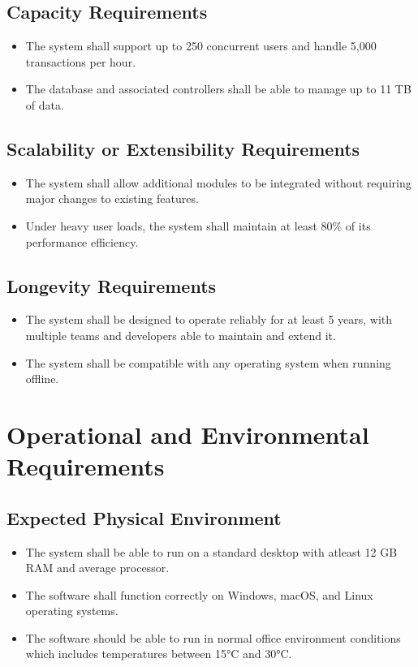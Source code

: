 \documentclass[12pt]{article}
\begin{document}
\subsection{Capacity Requirements}
\begin{itemize}
    \item The system shall support up to 250 concurrent users and handle 5,000 transactions per hour.
    \item The database and associated controllers shall be able to manage up to 11 TB of data.
\end{itemize}

\subsection{Scalability or Extensibility Requirements}
\begin{itemize}
    \item The system shall allow additional modules to be integrated without requiring major changes to existing features.
    \item Under heavy user loads, the system shall maintain at least 80\% of its performance efficiency.
\end{itemize}

\subsection{Longevity Requirements}
\begin{itemize}
    \item The system shall be designed to operate reliably for at least 5 years, with multiple teams and developers able to maintain and extend it.
    \item The system shall be compatible with any operating system when running offline.
\end{itemize}


\section{Operational and Environmental Requirements}
\subsection{Expected Physical Environment}
\begin{itemize}
    \item The system shall be able to run on a standard desktop with atleast 12 GB RAM and average processor.
    \item The software shall function correctly on Windows, macOS, and Linux operating systems.
    \item The software should be able to run in normal office environment conditions which includes temperatures between 15°C and 30°C. 
\end{itemize}
\end{document}
